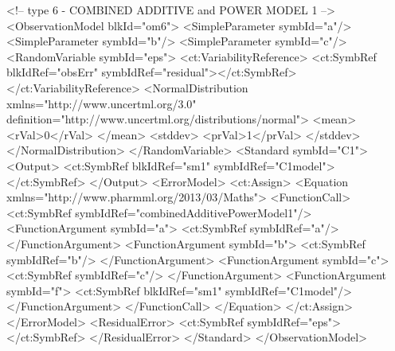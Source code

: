 \documentclass[a4paper,10pt]{article}
\begin{document}
\begin{xmlcode}
<!-- type 6 - COMBINED ADDITIVE and POWER MODEL 1 -->
<ObservationModel blkId="om6">
    <SimpleParameter symbId="a"/>
    <SimpleParameter symbId="b"/>
    <SimpleParameter symbId="c"/>
    <RandomVariable symbId="eps">
        <ct:VariabilityReference>
            <ct:SymbRef blkIdRef="obsErr" symbIdRef="residual"></ct:SymbRef>
        </ct:VariabilityReference>
        <NormalDistribution xmlns="http://www.uncertml.org/3.0" definition="http://www.uncertml.org/distributions/normal">
            <mean>
                <rVal>0</rVal>
            </mean>
            <stddev>
                <prVal>1</prVal>
            </stddev>
        </NormalDistribution>
    </RandomVariable>
    <Standard symbId="C1">
        <Output>
            <ct:SymbRef blkIdRef="sm1" symbIdRef="C1model"></ct:SymbRef>
        </Output>
        <ErrorModel>
            <ct:Assign>
                <Equation xmlns="http://www.pharmml.org/2013/03/Maths">
                    <FunctionCall>
                        <ct:SymbRef symbIdRef="combinedAdditivePowerModel1"/>
                        <FunctionArgument symbId="a">
                            <ct:SymbRef symbIdRef="a"/>
                        </FunctionArgument>
                        <FunctionArgument symbId="b">
                            <ct:SymbRef symbIdRef="b"/>
                        </FunctionArgument>
                        <FunctionArgument symbId="c">
                            <ct:SymbRef symbIdRef="c"/>
                        </FunctionArgument>
                        <FunctionArgument symbId="f">
                            <ct:SymbRef blkIdRef="sm1" symbIdRef="C1model"/>
                        </FunctionArgument>
                    </FunctionCall>
                </Equation>
            </ct:Assign>
        </ErrorModel>
        <ResidualError>
            <ct:SymbRef symbIdRef="eps"></ct:SymbRef>
        </ResidualError>
    </Standard>
</ObservationModel>
\end{xmlcode}



\end{document}
